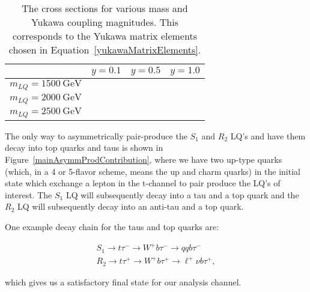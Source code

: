         \begin{table}[b]
            \centering
            \begin{tabular}{c|c|c|c}
                 & $y=0.1$ & $y=0.5$ & $y=1.0$ \\ \hline
                $m_{LQ}=1500\ \text{GeV}$ & & & \\ \hline
                $m_{LQ}=2000\ \text{GeV}$ & & & \\ \hline
                $m_{LQ}=2500\ \text{GeV}$ & & & \\
            \end{tabular}
            \caption{The cross sections for various mass and Yukawa coupling magnitudes. This corresponds to the Yukawa matrix elements chosen in Equation~\eqref{yukawaMatrixElements}.}
            \label{crossSections}
        \end{table}

        
        
        The only way to asymmetrically pair-produce the $S_1$ and $R_2$ LQ's and have them decay into top quarks and taus is shown in Figure~\ref{mainAsymmProdContribution}, where we have two up-type quarks (which, in a 4 or 5-flavor scheme, means the up and charm quarks) in the initial state which exchange a lepton in the t-channel to pair produce the LQ's of interest. The $S_1$ LQ will subsequently decay into a tau and a top quark and the $R_2$ LQ will subsequently decay into an anti-tau and a top quark.

        One example decay chain for the taus and top quarks are:

        \begin{gather}
            S_1 \rightarrow t\tau^- \rightarrow W^+ b \tau^- \rightarrow qqb\tau^- \\
            R_2 \rightarrow t\tau^+ \rightarrow W^+ b \tau^+ \rightarrow \ell^+ \nu b \tau^+,
        \end{gather}

        which gives us a satisfactory final state for our analysis channel.